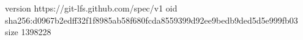 version https://git-lfs.github.com/spec/v1
oid sha256:d0967b2edff32f1f8985ab58f680fcda8559399d92ee9bedb9ded5d5e999fb03
size 1398228
